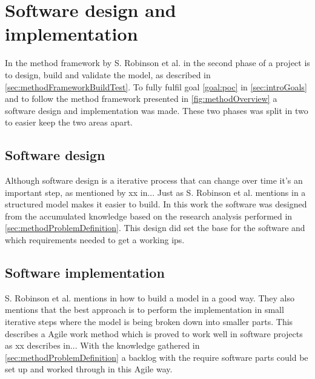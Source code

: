 \section{Software design and implementation}\label{sec:methodSoftwareDesignImplementation}
In the method framework by S. Robinson et al. in \cite{SecretsSuccessfulSimulation1995} the second phase of a project is to design, build and validate the model, as described in \cref{sec:methodFrameworkBuildTest}. 
To fully fulfil goal \ref{goal:poc} in \cref{sec:introGoals} and to follow the method framework presented in \cref{fig:methodOverview} a software design and implementation was made.
These two phases was split in two to easier keep the two areas apart.


\subsection{Software design}\label{sec:methodSoftwareDesign}
Although software design is a iterative process that can change over time it's  an important step, as mentioned by xx in...
Just as S. Robinson et al. mentions in \cite{SecretsSuccessfulSimulation1995} a structured model makes it easier to build.
In this work the software was designed from the accumulated knowledge based on the research analysis performed in \cref{sec:methodProblemDefinition}.
This design did set the base for the software and which requirements needed to get a working \acrshort{ips}.

\subsection{Software implementation}\label{sec:methodSoftwareImplementation}
S. Robinson et al. mentions in \cite{SecretsSuccessfulSimulation1995} how to build a model in a good way.
They also mentions that the best approach is to perform the implementation in small iterative steps where the model is being broken down into smaller parts.
This describes a Agile work method which is proved to work well in software projects as xx describes in...
With the knowledge gathered in \cref{sec:methodProblemDefinition} a backlog with the require software parts could be set up and worked through in this Agile way.
